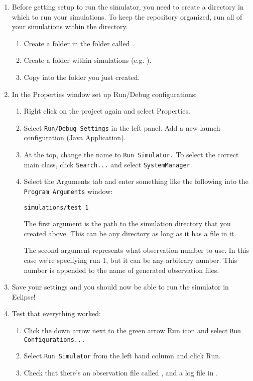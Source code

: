 \documentclass[11pt]{article}
\begin{document}
\begin{enumerate}
\item Before getting setup to run the simulator, you need to create a directory in which to run your simulations.  To keep the repository organized, run all of your simulations within the  directory.
  \begin{enumerate}
  \item Create a folder in the  folder called .
  \item Create a folder within simulations (e.g. ).
  \item Copy  into the folder you just created.
  \end{enumerate}

\item In the Properties window set up Run/Debug configurations:
  \begin{enumerate}
  \item Right click on the project again and select Properties.
  \item Select \verb|Run/Debug Settings| in the left panel. Add a new launch configuration (Java Application).
  \item At the top, change the name to \verb|Run Simulator.| To select the
    correct main class, click \verb|Search...| and select \verb|SystemManager|.
  \item Select the Arguments tab and enter something like the following into the \verb|Program Arguments| window:

\begin{verbatim}
simulations/test 1
\end{verbatim}

The first argument is the path to the simulation directory that you created above.  This can be any directory as long as it has a
 file in it.

The second argument represents what observation number to use. In this case we're specifying run 1, but it can be any arbitrary number. This number is appended to the name of generated observation files.
  \end{enumerate}
  
\item Save your settings and you should now be able to run the simulator in Eclipse!

\item Test that everything worked:
  \begin{enumerate}
  \item Click the down arrow next to the green arrow Run icon and select
    \verb|Run Configurations...|
  \item Select \verb|Run Simulator| from the left hand column and click Run.
  \item Check that there's an observation file called
    , and a log file in
    .
  \end{enumerate}

\end{enumerate}
\end{document}
